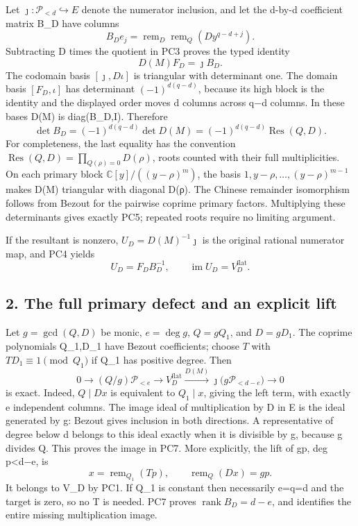 \documentclass[11pt]{article}
\begin{document}
Let \(\jmath:\mathcal P_{<d}\hookrightarrow E\) denote the numerator inclusion, and let the d-by-d coefficient matrix B\_D have columns \[
B_De_j=\operatorname{rem}_D\operatorname{rem}_Q(Dy^{q-d+j}).
\] Subtracting D times the quotient in PC3 proves the typed identity \[
D(M)F_D=\jmath B_D.
\tag{PC4}
\] The codomain basis \([\jmath,D\iota]\) is triangular with determinant one. The domain basis \([F_D,\iota]\) has determinant \((-1)^{d(q-d)}\), because its high block is the identity and the displayed order moves d columns across q−d columns. In these bases D(M) is diag(B\_D,I). Therefore \[
\det B_D=(-1)^{d(q-d)}\det D(M)
=(-1)^{d(q-d)}\operatorname{Res}(Q,D).
\tag{PC5}
\] For completeness, the last equality has the convention \(\operatorname{Res}(Q,D)=\prod_{Q(\rho)=0}D(\rho)\), roots counted with their full multiplicities. On each primary block \(\mathbb C[y]/((y-\rho)^m)\), the basis \(1,y-\rho,\ldots,(y-\rho)^{m-1}\) makes D(M) triangular with diagonal D(ρ). The Chinese remainder isomorphism follows from Bezout for the pairwise coprime primary factors. Multiplying these determinants gives exactly PC5; repeated roots require no limiting argument.

If the resultant is nonzero, \(U_D=D(M)^{-1}\jmath\) is the original rational numerator map, and PC4 yields \[
U_D=F_DB_D^{-1},\qquad \operatorname{im}U_D=V_D^{\mathrm{flat}}.
\tag{PC6}
\]

\subsection{2. The full primary defect and an explicit lift}\label{the-full-primary-defect-and-an-explicit-lift}

Let \(g=\gcd(Q,D)\) be monic, \(e=\deg g\), \(Q=gQ_1\), and \(D=gD_1\). The coprime polynomials Q\_1,D\_1 have Bezout coefficients; choose \(T\) with \(TD_1\equiv1\pmod{Q_1}\) if Q\_1 has positive degree. Then \[
0\longrightarrow (Q/g)\mathcal P_{<e}
\longrightarrow V_D^{\mathrm{flat}}
\xrightarrow{D(M)}\jmath\bigl(g\mathcal P_{<d-e}\bigr)
\longrightarrow0
\tag{PC7}
\] is exact. Indeed, \(Q\mid Dx\) is equivalent to \(Q_1\mid x\), giving the left term, with exactly e independent columns. The image ideal of multiplication by D in E is the ideal generated by g: Bezout gives inclusion in both directions. A representative of degree below d belongs to this ideal exactly when it is divisible by g, because g divides Q. This proves the image in PC7. More explicitly, the lift of gp, deg p\textless d−e, is \[
x=\operatorname{rem}_{Q_1}(Tp),\qquad
\operatorname{rem}_Q(Dx)=gp.
\tag{PC8}
\] It belongs to V\_D by PC1. If Q\_1 is constant then necessarily e=q=d and the target is zero, so no T is needed. PC7 proves \(\operatorname{rank}B_D=d-e\), and identifies the entire missing multiplication image.
\end{document}
